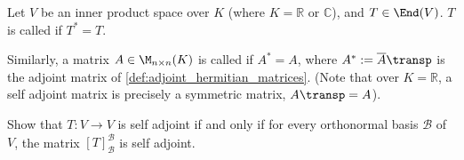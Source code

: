 \begin{definition}
\label{def:self_adjoint}
Let $V$ be an inner product space over $K$ (where $K = \mathbb{R}$ or $\mathbb{C}$), and $T \in \End(V)$. $T$ is called  if $T^* = T$. 

Similarly, a matrix $A \in \M_{n \times n}(K)$ is called  if $A^* = A$, where $A^* := \overline{A}\transp$ is the adjoint matrix of \cref{def:adjoint_hermitian_matrices}. (Note that over $K = \mathbb{R}$, a self adjoint matrix is precisely a symmetric matrix, $A\transp = A$).
\end{definition}

\begin{exercise}
\label{exc:self_adjoint_matrix_criterion}
Show that $T \colon V \to V$ is self adjoint if and only if for every orthonormal basis $\mathcal{B}$ of $V$, the matrix $[T]_{\mathcal{B}}^{\mathcal{B}}$ is self adjoint.
\end{exercise}


